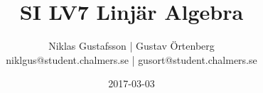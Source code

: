 \documentclass{article}
\title{SI LV7 Linjär Algebra}
\author{Niklas Gustafsson | Gustav Örtenberg  \\ \small{niklgus@student.chalmers.se} | \small{gusort@student.chalmers.se}}
\date{2017-03-03}
\begin{document}
\maketitle
\section{}


\section{}


\newpage
\section{}


\section{}


\section{}


\section{}

\end{document}
